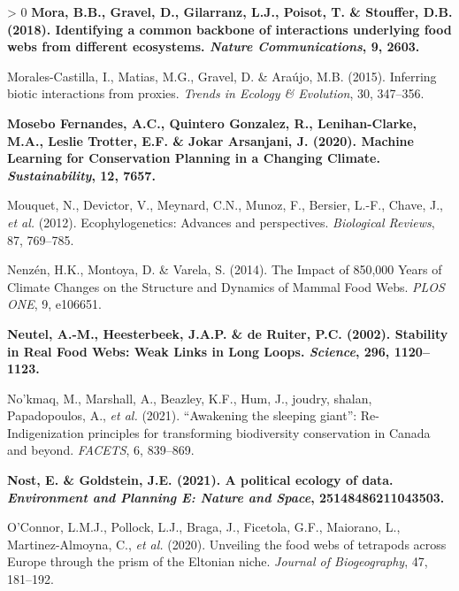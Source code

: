 \documentclass[11pt]{article}
\makeatletter
\def\maxwidth{\ifdim\Gin@nat@width>\linewidth\linewidth
\else\Gin@nat@width\fi}
\let\Oldincludegraphics\includegraphics
\renewcommand{\includegraphics}[1]{\Oldincludegraphics[width=\maxwidth]{#1}}
\newlength{\cslhangindent}
\newenvironment{CSLReferences}[3] %
 {%
  \setlength{\parindent}{0pt}
  \ifodd #1 \everypar{\setlength{\hangindent}{\cslhangindent}}\ignorespaces\fi
  \ifnum #2 > 0
  \setlength{\parskip}{#2\baselineskip}
  \fi
 }%
 {}
\providecommand{\DIFaddtex}[1]{{\bf #1}} %
\providecommand{\DIFaddbegin}{\protect\color{blue}} %
\providecommand{\DIFaddend}{\protect\color{black}} %
\providecommand{\DIFadd}[1]{\texorpdfstring{\DIFaddtex{#1}}{#1}} %
\newcommand{\DIFaddincludegraphics}[2][]{{\color{blue}\fbox{\DIFOincludegraphics[#1]{#2}}}} %
\DeclareRobustCommand{\DIFaddbegin}{\DIFOaddbegin \let\includegraphics\DIFaddincludegraphics} %
\DeclareRobustCommand{\DIFaddend}{\DIFOaddend \let\includegraphics\DIFOincludegraphics} %
\makeatother
\begin{document}
\begin{CSLReferences}{1}{0}
\leavevmode\DIFaddbegin \hypertarget{ref-Mora2018IdeCom}{}%
\DIFadd{Mora, B.B., Gravel, D., Gilarranz, L.J., Poisot, T. \& Stouffer, D.B.
(2018). Identifying a common backbone of interactions underlying food
webs from different ecosystems. \emph{Nature Communications}, 9, 2603.
}

\leavevmode\DIFaddend \hypertarget{ref-Morales-Castilla2015InfBio}{}%
Morales-Castilla, I., Matias, M.G., Gravel, D. \& Araújo, M.B. (2015).
Inferring biotic interactions from proxies. \emph{Trends in Ecology \&
Evolution}, 30, 347--356.

\leavevmode\DIFaddbegin \hypertarget{ref-MoseboFernandes2020MacLea}{}%
\DIFadd{Mosebo Fernandes, A.C., Quintero Gonzalez, R., Lenihan-Clarke, M.A.,
Leslie Trotter, E.F. \& Jokar Arsanjani, J. (2020). Machine Learning for
Conservation Planning in a Changing Climate. \emph{Sustainability}, 12,
7657.
}

\leavevmode\DIFaddend \hypertarget{ref-Mouquet2012EcoAdv}{}%
Mouquet, N., Devictor, V., Meynard, C.N., Munoz, F., Bersier, L.-F.,
Chave, J., \emph{et al.} (2012). Ecophylogenetics: Advances and
perspectives. \emph{Biological Reviews}, 87, 769--785.

\leavevmode\hypertarget{ref-Nenzen2014Imp850}{}%
Nenzén, H.K., Montoya, D. \& Varela, S. (2014). The Impact of 850,000
Years of Climate Changes on the Structure and Dynamics of Mammal Food
Webs. \emph{PLOS ONE}, 9, e106651.

\leavevmode\DIFaddbegin \hypertarget{ref-Neutel2002StaRea}{}%
\DIFadd{Neutel, A.-M., Heesterbeek, J.A.P. \& de Ruiter, P.C. (2002). Stability
in Real Food Webs: Weak Links in Long Loops. \emph{Science}, 296,
1120--1123.
}

\leavevmode\DIFaddend \hypertarget{ref-Nokmaq2021AwaSle}{}%
No'kmaq, M., Marshall, A., Beazley, K.F., Hum, J., joudry, shalan,
Papadopoulos, A., \emph{et al.} (2021). {``Awakening the sleeping
giant''}: Re-Indigenization principles for transforming biodiversity
conservation in Canada and beyond. \emph{FACETS}, 6, 839--869.

\leavevmode\DIFaddbegin \hypertarget{ref-Nost2021PolEco}{}%
\DIFadd{Nost, E. \& Goldstein, J.E. (2021). A political ecology of data.
\emph{Environment and Planning E: Nature and Space}, 25148486211043503.
}

\leavevmode\DIFaddend \hypertarget{ref-OConnor2020UnvFoo}{}%
O'Connor, L.M.J., Pollock, L.J., Braga, J., Ficetola, G.F., Maiorano,
L., Martinez-Almoyna, C., \emph{et al.} (2020). Unveiling the food webs
of tetrapods across Europe through the prism of the Eltonian niche.
\emph{Journal of Biogeography}, 47, 181--192.


\end{CSLReferences}
\end{document}
